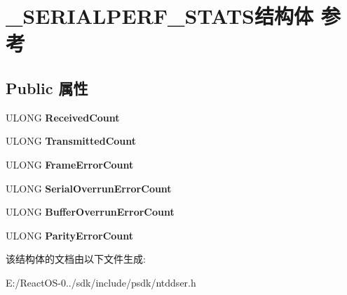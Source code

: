 \hypertarget{struct___s_e_r_i_a_l_p_e_r_f___s_t_a_t_s}{}\section{\+\_\+\+S\+E\+R\+I\+A\+L\+P\+E\+R\+F\+\_\+\+S\+T\+A\+T\+S结构体 参考}
\label{struct___s_e_r_i_a_l_p_e_r_f___s_t_a_t_s}
\subsection*{Public 属性}
\begin{DoxyCompactItemize}
\item 
\mbox{\label{struct___s_e_r_i_a_l_p_e_r_f___s_t_a_t_s_a97d04990791f3f95eac8b957fafa48d5}} 
U\+L\+O\+NG {\bfseries Received\+Count}
\item 
\mbox{\label{struct___s_e_r_i_a_l_p_e_r_f___s_t_a_t_s_a914e5a2ff6f1965ce719a801945e586b}} 
U\+L\+O\+NG {\bfseries Transmitted\+Count}
\item 
\mbox{\label{struct___s_e_r_i_a_l_p_e_r_f___s_t_a_t_s_a15552535c99bbf9c713e6d8273781179}} 
U\+L\+O\+NG {\bfseries Frame\+Error\+Count}
\item 
\mbox{\label{struct___s_e_r_i_a_l_p_e_r_f___s_t_a_t_s_a8749e486e5034b686726eb032929c8c7}} 
U\+L\+O\+NG {\bfseries Serial\+Overrun\+Error\+Count}
\item 
\mbox{\label{struct___s_e_r_i_a_l_p_e_r_f___s_t_a_t_s_ad8570f7157f41e6c33de290664c7b988}} 
U\+L\+O\+NG {\bfseries Buffer\+Overrun\+Error\+Count}
\item 
\mbox{\label{struct___s_e_r_i_a_l_p_e_r_f___s_t_a_t_s_a0a9f8bfe570b0501b399b11a2fad57e5}} 
U\+L\+O\+NG {\bfseries Parity\+Error\+Count}
\end{DoxyCompactItemize}


该结构体的文档由以下文件生成\+:\begin{DoxyCompactItemize}
\item 
E\+:/\+React\+O\+S-\/0../sdk/include/psdk/ntddser.\+h\end{DoxyCompactItemize}
